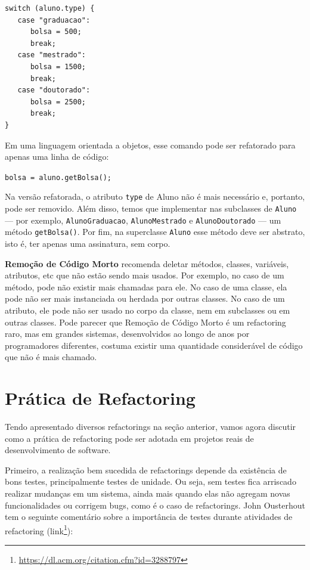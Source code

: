 \documentclass[
  11pt,
  twoside]{book}
\newcommand{\passthrough}[1]{#1}
\DeclareRobustCommand{\href}[2]{#2\footnote{\url{#1}}}
\begin{document}
\begin{lstlisting}
switch (aluno.type) {
   case "graduacao": 
      bolsa = 500;
      break;
   case "mestrado": 
      bolsa = 1500;
      break;
   case "doutorado": 
      bolsa = 2500;
      break;
}
\end{lstlisting}

Em uma linguagem orientada a objetos, esse comando pode ser refatorado
para apenas uma linha de código:

\passthrough{\lstinline!bolsa = aluno.getBolsa();!}

Na versão refatorada, o atributo \passthrough{\lstinline!type!} de Aluno
não é mais necessário e, portanto, pode ser removido. Além disso, temos
que implementar nas subclasses de \passthrough{\lstinline!Aluno!} ---
por exemplo, \passthrough{\lstinline!AlunoGraduacao!},
\passthrough{\lstinline!AlunoMestrado!} e
\passthrough{\lstinline!AlunoDoutorado!} --- um método
\passthrough{\lstinline!getBolsa()!}. Por fim, na superclasse
\passthrough{\lstinline!Aluno!} esse método deve ser abstrato, isto é,
ter apenas uma assinatura, sem corpo.

 \textbf{Remoção de Código
Morto} recomenda deletar métodos, classes, variáveis, atributos, etc que
não estão sendo mais usados. Por exemplo, no caso de um método, pode não
existir mais chamadas para ele. No caso de uma classe, ela pode não ser
mais instanciada ou herdada por outras classes. No caso de um atributo,
ele pode não ser usado no corpo da classe, nem em subclasses ou em
outras classes. Pode parecer que Remoção de Código Morto é um
refactoring raro, mas em grandes sistemas, desenvolvidos ao longo de
anos por programadores diferentes, costuma existir uma quantidade
considerável de código que não é mais chamado.

\hypertarget{pruxe1tica-de-refactoring}{%
\section{Prática de Refactoring}\label{pruxe1tica-de-refactoring}}

Tendo apresentado diversos refactorings na seção anterior, vamos agora
discutir como a prática de refactoring pode ser adotada em projetos
reais de desenvolvimento de software.

Primeiro, a realização bem sucedida de refactorings depende da
existência de bons testes, principalmente testes de unidade. Ou seja,
sem testes fica arriscado realizar mudanças em um sistema, ainda mais
quando elas não agregam novas funcionalidades ou corrigem bugs, como é o
caso de refactorings. John Ousterhout tem o seguinte comentário sobre a
importância de testes durante atividades de refactoring
(\href{https://dl.acm.org/citation.cfm?id=3288797}{link}):
\end{document}
